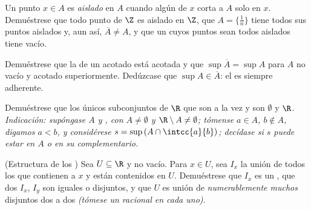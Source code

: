 \begin{exercise}[$\star\star$]\label{exo:b1:topology:7}
Un punto $x \in A$ es \emph{aislado} en $A$ cuando algún  de
$x$ corta a $A$ solo en $x$. Demuéstrese que todo punto de $\Z$ es
aislado en $\Z$, que $A = \{\frac1n\}$ tiene todos sus puntos aislados
y, aun así, $\overline A \neq A$, y que un  cuyos puntos sean
todos aislados tiene  vacío.
\end{exercise}

\begin{exercise}[$\star\star$]\label{exo:b1:topology:8}
Demuéstrese que la  de un  acotado está acotada y que
$\sup \overline A = \sup A$ para $A$ no vacío y acotado
superiormente. Dedúzcase que $\sup A \in \overline A$: el  es
siempre adherente.
\end{exercise}

\begin{exercise}[$\star\star\star$]\label{exo:b1:topology:9}
Demuéstrese que los únicos subconjuntos de $\R$ que son a la vez
 y  son $\emptyset$ y $\R$.
\emph{Indicación: supóngase $A$  y , con
$A \neq \emptyset$ y $\R \setminus A \neq \emptyset$; tómense $a \in
A$, $b \notin A$, digamos $a < b$, y considérese $s = \sup\,(A \cap
\intcc{a}{b})$; decídase si $s$ puede estar en $A$ o en su complementario.}
\end{exercise}

\begin{exercise}[$\star\star\star$]\label{exo:b1:topology:10}
(Estructura de los ) Sea $U \subseteq \R$  y no vacío.
Para $x \in U$, sea $I_x$ la unión de todos los  
que contienen a $x$ y están contenidos en $U$. Demuéstrese que $I_x$
es un  , que dos  $I_x$, $I_y$ son iguales o
disjuntos, y que $U$ es unión de \emph{numerablemente muchos}
  disjuntos dos a dos \emph{(tómese un racional en cada uno)}.
\end{exercise}


